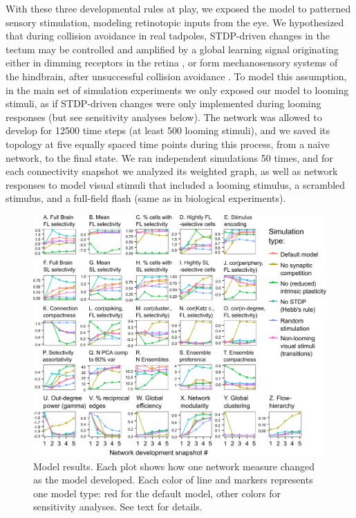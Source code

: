 \documentclass{article}
\begin{document}
With these three developmental rules at play, we exposed the model to patterned sensory stimulation, modeling retinotopic inputs from the eye. We hypothesized that during collision avoidance in real tadpoles, STDP-driven changes in the tectum may be controlled and amplified by a global learning signal \citep{savin2014stdpreward,aswolinskiy2015stdpreward} originating either in dimming receptors in the retina \citep{baranauskas2012}, or form mechanosensory systems of the hindbrain, after unsuccessful collision avoidance \citep{pratt2009multisens,felch2016,truszkowski2017}. To model this assumption, in the main set of simulation experiments we only exposed our model to looming stimuli, as if STDP-driven changes were only implemented during looming responses (but see sensitivity analyses below). The network was allowed to develop for 12500 time steps (at least 500 looming stimuli), and we saved its topology at five equally spaced time points during this process, from a naive network, to the final state. We ran independent simulations 50 times, and for each connectivity snapshot we analyzed its weighted graph, as well as network responses to model visual stimuli that included a looming stimulus, a scrambled stimulus, and a full-field flash (same as in biological experiments).

\begin{figure}
\includegraphics[width=\linewidth]{fig8.pdf}
\caption{
Model results. Each plot shows how one network measure changed as the model developed. Each color of line and markers represents one model type: red for the default model, other colors for sensitivity analyses. See text for details.}
\end{figure}
\end{document}
